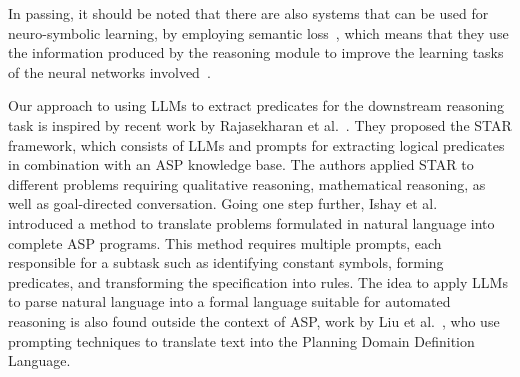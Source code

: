 In passing, it should be noted that there are also systems that can be used for neuro-symbolic learning, \egc by employing semantic loss~\cite{xu2018sl}, which means that they use the information produced by the reasoning module to improve the learning tasks of the neural networks involved~\cite{yang2020neurasp,ManhaeveDKDR21}.

Our approach to using LLMs to extract predicates for the downstream reasoning task is inspired by recent work by Rajasekharan et al.~\cite{rajasekharan23}. They proposed the STAR framework, which consists of LLMs and prompts for extracting logical predicates in combination with an ASP knowledge base. The authors applied STAR to different problems requiring qualitative reasoning, mathematical reasoning, as well as goal-directed conversation. 
%
Going one step further, Ishay et al.~\cite{ishay23} introduced a method to translate problems formulated in natural language into complete ASP programs. This method requires multiple prompts, each responsible for a subtask such as identifying constant symbols, forming predicates, and transforming the specification into rules. %
%
The idea to apply LLMs to parse natural language into a formal language suitable for automated reasoning is also found outside the context of ASP, \egc work by Liu et al.~\cite{liu23}, who use prompting techniques to translate text into the Planning Domain Definition Language.



